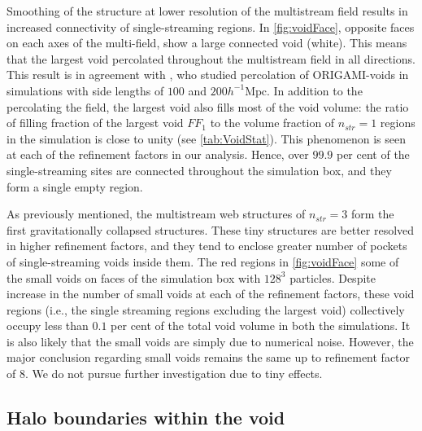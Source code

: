 \documentclass[fleqn,usenatbib,useAMS]{mnras}
\begin{document}
Smoothing of the structure at lower resolution of the multistream field results in increased connectivity of single-streaming regions. In \autoref{fig:voidFace}, opposite faces on each axes of the multi-field, show a large connected void (white). This means that the largest void percolated throughout the multistream field in all directions. This result is in agreement with \cite{Falck2015}, who studied percolation of ORIGAMI-voids in simulations with side lengths of $100$ and $200  h^{-1} \text{Mpc}$. In addition to the percolating the field, the largest void also fills most of the void volume: the ratio of filling fraction of the largest void $FF_1$ to the volume fraction of $n_{str} = 1$ regions in the simulation is close to unity (see \autoref{tab:VoidStat}). This phenomenon is seen at each of the refinement factors in our analysis. Hence, over $99.9$ per cent of the single-streaming sites are connected throughout the simulation box, and they form a single empty region.  
    

As previously mentioned, the multistream web structures of $n_{str} = 3$ form the first gravitationally collapsed structures. These tiny structures are better resolved in higher refinement factors, and they tend to enclose greater number of pockets of single-streaming voids inside them. The red regions in \autoref{fig:voidFace} some of the small voids on faces of the simulation box with $128^3$ particles. Despite increase in the number of small voids at each of the refinement factors, these void regions (i.e., the single streaming regions excluding the largest void) collectively occupy less than $0.1$ per cent of the total void volume in both the simulations. It is also likely that the small voids are simply due to numerical noise. However, the major conclusion regarding small voids remains the same up to refinement factor of 8. We do not pursue further investigation due to tiny effects.  

 
\subsection{Halo boundaries within the void}
\label{sec:voidHaloes}
\end{document}

